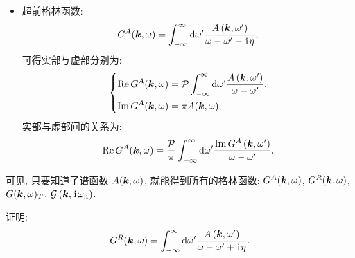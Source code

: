 \begin{itemize}
\begin{equation}
\end{equation}
\item 超前格林函数:
\begin{equation}
 G^A(\boldsymbol{k}, \omega)=\int_{-\infty}^{\infty} \mathrm{d} \omega^{\prime} \frac{A\left(\boldsymbol{k}, \omega^{\prime}\right)}{\omega-\omega^{\prime}-\hspace{0.1em}\mathrm{i}\hspace{0.1em} \eta},
\end{equation}
可得实部与虚部分别为:
\begin{equation}
\left\{\begin{aligned}
\operatorname{Re} G^A(\boldsymbol{k}, \omega)&=\mathcal{P} \int_{-\infty}^{\infty} \mathrm{d} \omega^{\prime} \frac{A\left(\boldsymbol{k}, \omega^{\prime}\right)}{\omega-\omega^{\prime}},\\
\operatorname{Im} G^A(\boldsymbol{k}, \omega)&=\pi A(\boldsymbol{k}, \omega) ,
\end{aligned}\right.
\end{equation}
实部与虚部间的关系为:
\begin{equation}
\operatorname{Re} G^A(\boldsymbol{k}, \omega)=\frac{\mathcal{P}}{\pi} \int_{-\infty}^{\infty} \mathrm{d} \omega^{\prime} \frac{\operatorname{Im} G^A\left(\boldsymbol{k}, \omega^{\prime}\right)}{\omega-\omega^{\prime}} .
\end{equation}
\end{itemize}
可见, 只要知道了谱函数 $A(\boldsymbol{k}, \omega)$, 就能得到所有的格林函数: $G^A(\boldsymbol{k}, \omega)$, $G^R(\boldsymbol{k}, \omega)$, $G(\boldsymbol{k}, \omega)_T$, $\mathcal{G}\left(\boldsymbol{k}, \hspace{0.1em}\mathrm{i}\hspace{0.1em} \omega_n\right)$. 

\begin{question}{}{}
证明:
\begin{equation}
 G^R(\boldsymbol{k}, \omega)=\int_{-\infty}^{\infty} \mathrm{d} \omega^{\prime} \frac{A\left(\boldsymbol{k}, \omega^{\prime}\right)}{\omega-\omega^{\prime}+\hspace{0.1em}\mathrm{i}\hspace{0.1em} \eta}.
\end{equation}
\end{question}

